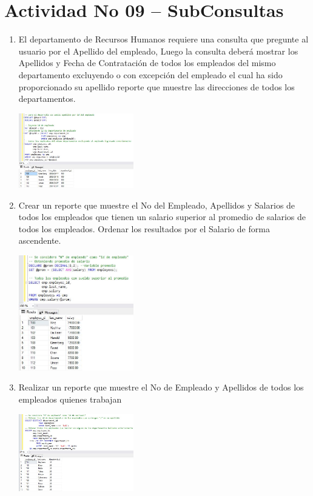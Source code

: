 \section{Actividad No 09 – SubConsultas} 
		
\begin{enumerate}[1.]
	\item El departamento de Recursos Humanos requiere una consulta que pregunte al usuario por el Apellido del empleado, Luego la consulta deber\'a mostrar los Apellidos y Fecha de Contrataci\'on de todos los empleados del mismo departamento excluyendo o con excepción del empleado el cual ha sido proporcionado su apellido reporte que muestre las direcciones de todos los departamentos.

	\begin{center}
	\includegraphics[width=5cm]{./Imagenes/actividad0901} 
	\end{center}

	\item Crear un reporte que muestre el No del Empleado, Apellidos y Salarios de todos los empleados que tienen un salario superior al promedio de salarios de todos los empleados. Ordenar los resultados por el Salario de forma ascendente.

	\begin{center}
	\includegraphics[width=5cm]{./Imagenes/actividad0902} 
	\end{center}

	\item Realizar un reporte que muestre el No de Empleado y Apellidos de todos los empleados quienes trabajan

	\begin{center}
	\includegraphics[width=5cm]{./Imagenes/actividad0903} 
	\end{center}


\end{enumerate}
